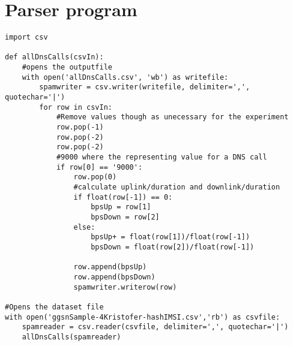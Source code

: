\chapter{Parser program}
\label{chp:parserprogram}

\begin{Verbatim}
import csv

def allDnsCalls(csvIn):
	#opens the outputfile
	with open('allDnsCalls.csv', 'wb') as writefile:
		spamwriter = csv.writer(writefile, delimiter=',', quotechar='|')
		for row in csvIn:
			#Remove values though as unecessary for the experiment
			row.pop(-1)
			row.pop(-2)
			row.pop(-2)
			#9000 where the representing value for a DNS call
			if row[0] == '9000':
				row.pop(0)
				#calculate uplink/duration and downlink/duration
				if float(row[-1]) == 0:
					bpsUp = row[1]
					bpsDown = row[2]
				else:
					bpsUp+ = float(row[1])/float(row[-1])
					bpsDown = float(row[2])/float(row[-1])
				
				row.append(bpsUp)
				row.append(bpsDown)
				spamwriter.writerow(row)

#Opens the dataset file
with open('ggsnSample-4Kristofer-hashIMSI.csv','rb') as csvfile:
	spamreader = csv.reader(csvfile, delimiter=',', quotechar='|')
	allDnsCalls(spamreader)
\end{Verbatim}